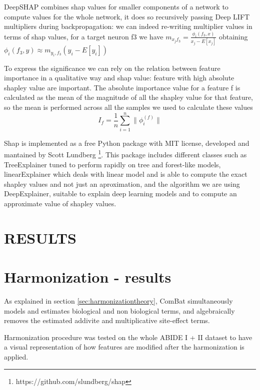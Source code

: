 \documentclass[a4paper,11pt]{article}
\begin{document}
DeepSHAP combines shap values for smaller components of a network to compute values for the whole network, it does so recursively passing Deep LIFT multipliers during backpropagation: we can indeed re-writing multiplier values in terms of shap values, for a target neuron f3 we have $m_{x_j f_3} = \frac{\phi_i(f_3, x)}{x_j - E[x_j]}$ obtaining $\phi_i(f_3, y) \approx m_{y_i, f_3}(y_i - E[y_i])$


To express the significance we can rely on the relation between feature importance in a qualitative way and shap value: feature with high absolute shapley value are important.
The absolute importance value for a feature f is calculated as the mean of the magnitude of all the shapley value for that feature, so the mean is performed across all the samples we used to calculate these values
\begin{equation}\label{eq:shap_magnitude}
I_f = \frac{1}{n} \sum_{i = 1}^n \|\phi_i^{(f)}\|
\end{equation}

Shap is implemented as a free Python package with MIT license, developed and mantained by Scott Lundberg \footnote{https://github.com/slundberg/shap}.
This package includes different classes such as TreeExplainer tuned to perform rapidly on tree and forest-like models, linearExplainer which deals with linear model and is able to compute the exact shapley values and not just an aproximation, and the algorithm we are using DeepExplainer, suitable to explain deep learning models and to compute an approximate value of shapley values.


\newpage

\section*{RESULTS}

\section{Harmonization - results}


As explained in section \ref{sec:harmonizationtheory}, ComBat simultaneously models and estimates biological and non biological terms, and algebraically removes the estimated addivite and multiplicative site-effect terms.

Harmonization procedure was tested on the whole ABIDE I + II dataset to have a visual representation of how features are modified after the harmonization is applied.
\end{document}
